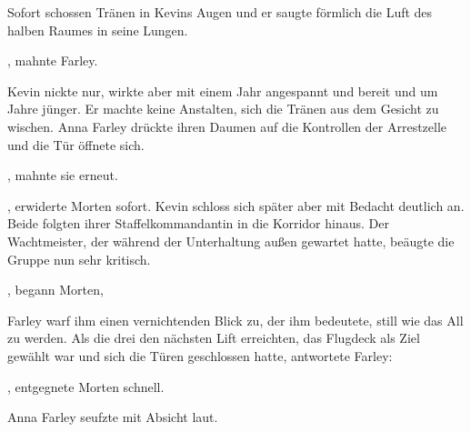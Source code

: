 \par

Sofort schossen Tränen in Kevins Augen und er saugte förmlich die Luft des halben Raumes in seine Lungen.

\par

, mahnte Farley. 

\par

Kevin nickte nur, wirkte aber mit einem Jahr angespannt und bereit und um Jahre jünger. Er machte keine Anstalten, sich die Tränen aus dem Gesicht zu wischen. Anna Farley drückte ihren Daumen auf die Kontrollen der Arrestzelle und die Tür öffnete sich.

\par

, mahnte sie erneut. 

\par

, erwiderte Morten sofort. Kevin schloss sich später aber mit Bedacht deutlich an. Beide folgten ihrer Staffelkommandantin in die Korridor hinaus. Der Wachtmeister, der während der Unterhaltung außen gewartet hatte, beäugte die Gruppe nun sehr kritisch.

\par

, begann Morten, 

\par

Farley warf ihm einen vernichtenden Blick zu, der ihm bedeutete, still wie das All zu werden. Als die drei den nächsten Lift erreichten, das Flugdeck als Ziel gewählt war und sich die Türen geschlossen hatte, antwortete Farley: 

\par

, entgegnete Morten schnell.

\par

Anna Farley seufzte mit Absicht laut. 

